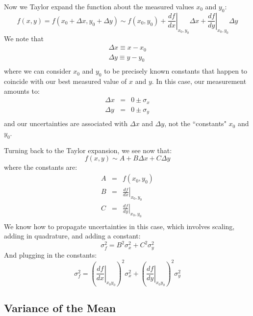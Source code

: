 \documentclass[12pt]{article}
\begin{document}
Now we Taylor expand the function about the measured values $x_0$ and $y_0$:
\begin{equation*}
f(x,y) = f(x_0+\Delta x,y_0 + \Delta y) \sim f(x_0,y_0) + \left.\frac{df}{dx}\right|_{x_0,y_0} \Delta x + \left.\frac{df}{dy}\right|_{x_0,y_0} \Delta y 
\end{equation*}
We note that 
\begin{eqnarray*}
\Delta x \equiv x - x_0 \\
\Delta y \equiv y - y_0 \\
\end{eqnarray*}
where we can consider $x_0$ and $y_0$ to be precisely known constants that happen to coincide with our best measured value of $x$ and $y$.  In this case, our measurement amounts to:
\begin{eqnarray*}
\Delta x &=& 0 \pm \sigma_x\\
\Delta y &=& 0 \pm \sigma_y\\
\end{eqnarray*}
and our uncertainties are associated with $\Delta x$ and $\Delta y$, not the ``constants" $x_0$ and $y_0$.

Turning back to the Taylor expansion, we see now that:
\begin{equation*}
f(x,y) \sim A + B \Delta x + C \Delta y 
\end{equation*}
where the constants are:
\begin{eqnarray*}
A  &=& f(x_0,y_0)\\
B  &=& \left.\frac{df}{dx}\right|_{x_0,y_0}\\
C  &=& \left.\frac{df}{dy}\right|_{x_0,y_0}\\
\end{eqnarray*}
We know how to propagate uncertainties in this case, which involves scaling, adding in quadrature, and adding a constant:
\begin{equation*}
\sigma_f^2 =   B^2 \sigma_x^2 + C^2 \sigma_y^2 
\end{equation*}
And plugging in the constants:
\begin{equation*}
\sigma^2_f = \left(\left.\frac{df}{dx}\right|_{x_0 y_0} \right)^2 \sigma^2_x  + \left( \left.\frac{df}{dy} \right|_{x_0 y_0} \right)^2 \sigma^2_y
\end{equation*}   

\subsection{Variance of the Mean}
\end{document}
